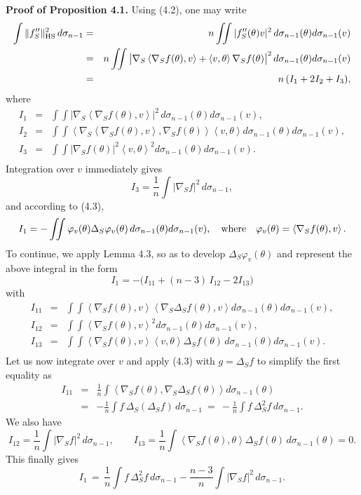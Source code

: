 \documentclass[reqno,12pt]{amsart}
\theoremstyle{plain}
\begin{document}
\vskip2mm
{\bf Proof of Proposition 4.1.} Using (4.2), one may write
\begin{eqnarray*}
\int \|f_S''\|_{\rm HS}^2\,d\sigma_{n-1}
 & = &
n \int\!\!\!\int |f_S''(\theta)v|^2\,d\sigma_{n-1}(\theta)d\sigma_{n-1}(v) \\
 & = &
n \int\!\!\!\int \big|\nabla_S \left<\nabla_S f(\theta),v\right> + 
\left<v,\theta\right> \nabla_S f(\theta)\big|^2\,
d\sigma_{n-1}(\theta)d\sigma_{n-1}(v) \\
 & = &
n\,(I_1 + 2 I_2 + I_3),
\end{eqnarray*}
where
\begin{eqnarray*}
I_1
 & = &
\int\!\!\!\int |\nabla_S \left<\nabla_S f(\theta),v\right>|^2\,
d\sigma_{n-1}(\theta)d\sigma_{n-1}(v), \\ 
I_2
 & = &
\int\!\!\!\int \left<\nabla_S \left<\nabla_S f(\theta),v\right>,
\nabla_S f(\theta)\right>
\left<v,\theta\right> d\sigma_{n-1}(\theta)d\sigma_{n-1}(v), \\ 
I_3
 & = &
\int\!\!\!\int |\nabla_S f(\theta)|^2 \left<v,\theta\right>^2
d\sigma_{n-1}(\theta)d\sigma_{n-1}(v). \\ 
\end{eqnarray*}
Integration over $v$ immediately gives
$$
I_3 = \frac{1}{n} \int |\nabla_S f|^2\,d\sigma_{n-1},
$$
and according to (4.3),
$$
I_1 = -\int\!\!\!\int \varphi_v(\theta) \Delta_S \varphi_v(\theta)\,
d\sigma_{n-1}(\theta)d\sigma_{n-1}(v), \quad {\rm where} \ \ \ 
\varphi_v(\theta) = \left<\nabla_S f(\theta),v\right>.
$$
To continue, we apply Lemma 4.3, so as to develop 
$\Delta_S \varphi_v(\theta)$ and represent the above integral in the form
$$
I_1 = -\big(I_{11} + (n-3)\,  I_{12} -  2I_{13}\big) 
$$
with
\begin{eqnarray*}
I_{11}
 & = &
\int\!\!\!\int \left<\nabla_S f(\theta),v\right>
\left<\nabla_S \Delta_S f(\theta),v\right>
d\sigma_{n-1}(\theta)d\sigma_{n-1}(v), \\
I_{12}
 & = &
\int\!\!\!\int \left<\nabla_S f(\theta),v\right>^2
d\sigma_{n-1}(\theta)d\sigma_{n-1}(v), \\
I_{13}
 & = &
\int\!\!\!\int \left<\nabla_S f(\theta),v\right>\left<v,\theta\right>
\Delta_S f(\theta)\, d\sigma_{n-1}(\theta)d\sigma_{n-1}(v). \\
\end{eqnarray*}
Let us now integrate over $v$ and apply (4.3) with $g = \Delta_S f$ 
to simplify the first equality as
\begin{eqnarray*}
I_{11} 
 & = &
\frac{1}{n} \int \left<\nabla_S f(\theta),\nabla_S \Delta_S f(\theta)\right>
d\sigma_{n-1}(\theta) \\
 & = &
-\frac{1}{n} \int f\, \Delta_S (\Delta_S f)\, d\sigma_{n-1} \ = \ 
-\frac{1}{n} \int f\, \Delta^2_S f\, d\sigma_{n-1}.
\end{eqnarray*}
We also have
$$
I_{12} = \frac{1}{n} \int |\nabla_S f|^2\,d\sigma_{n-1}, \qquad
I_{13} = \frac{1}{n} \int \left<\nabla_S f(\theta),\theta\right>
\Delta_S f(\theta)\,d\sigma_{n-1}(\theta) = 0.
$$
This finally gives
$$
I_1 \, = \, \frac{1}{n} \int f\, \Delta^2_S f\, d\sigma_{n-1} - 
\frac{n-3}{n} \int |\nabla_S f|^2\,d\sigma_{n-1}.
$$
\end{document}
